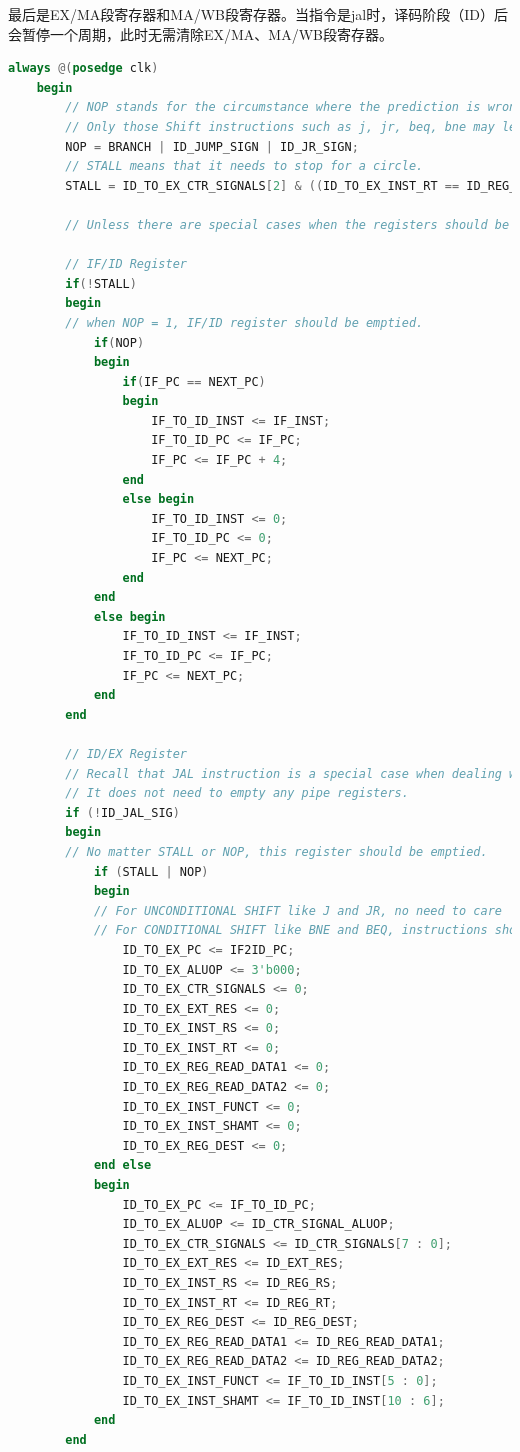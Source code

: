 最后是EX/MA段寄存器和MA/WB段寄存器。当指令是jal时，译码阶段（ID）后会暂停一个周期，此时无需清除EX/MA、MA/WB段寄存器。
\begin{lstlisting}[language=Verilog]
    always @(posedge clk) 
    begin
        // NOP stands for the circumstance where the prediction is wrong.
        // Only those Shift instructions such as j, jr, beq, bne may lead to wrong prediction.
        NOP = BRANCH | ID_JUMP_SIGN | ID_JR_SIGN;
        // STALL means that it needs to stop for a circle.
        STALL = ID_TO_EX_CTR_SIGNALS[2] & ((ID_TO_EX_INST_RT == ID_REG_RS) | (ID_TO_EX_INST_RT == ID_REG_RT)); 

        // Unless there are special cases when the registers should be emptied, registers should all be able to written into.

        // IF/ID Register 
        if(!STALL)
        begin
        // when NOP = 1, IF/ID register should be emptied.
            if(NOP)                         
            begin
                if(IF_PC == NEXT_PC)
                begin
                    IF_TO_ID_INST <= IF_INST;
                    IF_TO_ID_PC <= IF_PC;
                    IF_PC <= IF_PC + 4;
                end
                else begin
                    IF_TO_ID_INST <= 0;
                    IF_TO_ID_PC <= 0;
                    IF_PC <= NEXT_PC;
                end
            end
            else begin
                IF_TO_ID_INST <= IF_INST;
                IF_TO_ID_PC <= IF_PC;
                IF_PC <= NEXT_PC;
            end
        end
        
        // ID/EX Register
        // Recall that JAL instruction is a special case when dealing with NOP and STALL.
        // It does not need to empty any pipe registers.
        if (!ID_JAL_SIG)
        begin
        // No matter STALL or NOP, this register should be emptied.
            if (STALL | NOP)
            begin
            // For UNCONDITIONAL SHIFT like J and JR, no need to care
            // For CONDITIONAL SHIFT like BNE and BEQ, instructions should be interrupted here if something wrong happens.
                ID_TO_EX_PC <= IF2ID_PC;
                ID_TO_EX_ALUOP <= 3'b000;
                ID_TO_EX_CTR_SIGNALS <= 0;
                ID_TO_EX_EXT_RES <= 0;
                ID_TO_EX_INST_RS <= 0;
                ID_TO_EX_INST_RT <= 0;
                ID_TO_EX_REG_READ_DATA1 <= 0;
                ID_TO_EX_REG_READ_DATA2 <= 0;
                ID_TO_EX_INST_FUNCT <= 0;
                ID_TO_EX_INST_SHAMT <= 0;
                ID_TO_EX_REG_DEST <= 0;
            end else 
            begin
                ID_TO_EX_PC <= IF_TO_ID_PC;
                ID_TO_EX_ALUOP <= ID_CTR_SIGNAL_ALUOP;
                ID_TO_EX_CTR_SIGNALS <= ID_CTR_SIGNALS[7 : 0];
                ID_TO_EX_EXT_RES <= ID_EXT_RES;
                ID_TO_EX_INST_RS <= ID_REG_RS;
                ID_TO_EX_INST_RT <= ID_REG_RT;
                ID_TO_EX_REG_DEST <= ID_REG_DEST;
                ID_TO_EX_REG_READ_DATA1 <= ID_REG_READ_DATA1;
                ID_TO_EX_REG_READ_DATA2 <= ID_REG_READ_DATA2;
                ID_TO_EX_INST_FUNCT <= IF_TO_ID_INST[5 : 0];
                ID_TO_EX_INST_SHAMT <= IF_TO_ID_INST[10 : 6];
            end
        end


\end{lstlisting}
